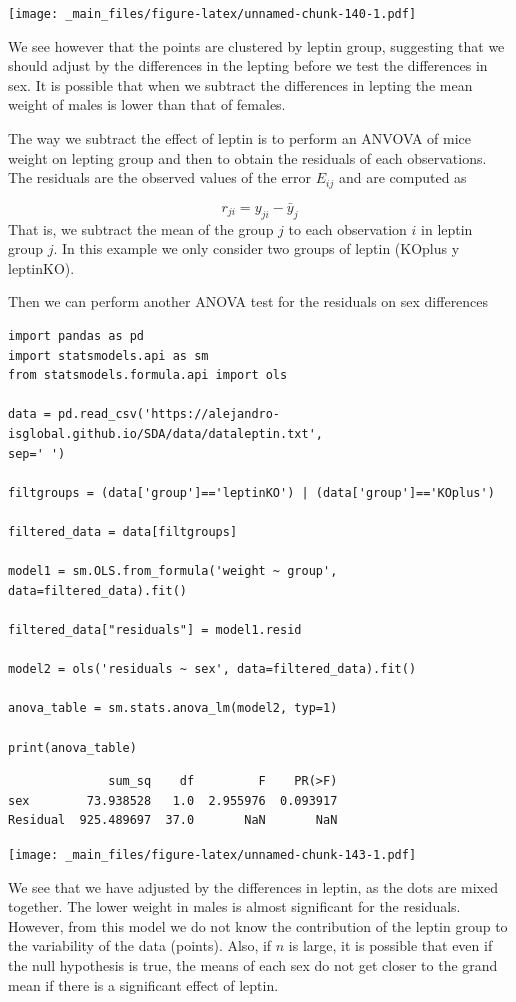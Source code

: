 \documentclass[
]{book}
\begin{document}
\texttt{[image: \_main\_files/figure-latex/unnamed-chunk-140-1.pdf]}

We see however that the points are clustered by leptin group, suggesting that we should adjust by the differences in the lepting before we test the differences in sex. It is possible that when we subtract the differences in lepting the mean weight of males is lower than that of females.

The way we subtract the effect of leptin is to perform an ANVOVA of mice weight on lepting group and then to obtain the residuals of each observations. The residuals are the observed values of the error \(E_{ij}\) and are computed as

\[r_{ji}=y_{ji}-\bar{y}_j\]
That is, we subtract the mean of the group \(j\) to each observation \(i\) in leptin group \(j\). In this example we only consider two groups of leptin (KOplus y leptinKO).

Then we can perform another ANOVA test for the residuals on sex differences

\begin{verbatim}
import pandas as pd
import statsmodels.api as sm
from statsmodels.formula.api import ols

data = pd.read_csv('https://alejandro-isglobal.github.io/SDA/data/dataleptin.txt', 
sep=' ')

filtgroups = (data['group']=='leptinKO') | (data['group']=='KOplus')

filtered_data = data[filtgroups]

model1 = sm.OLS.from_formula('weight ~ group', data=filtered_data).fit()

filtered_data["residuals"] = model1.resid

model2 = ols('residuals ~ sex', data=filtered_data).fit()

anova_table = sm.stats.anova_lm(model2, typ=1)

print(anova_table)
\end{verbatim}

\begin{verbatim}
              sum_sq    df         F    PR(>F)
sex        73.938528   1.0  2.955976  0.093917
Residual  925.489697  37.0       NaN       NaN
\end{verbatim}

\texttt{[image: \_main\_files/figure-latex/unnamed-chunk-143-1.pdf]}

We see that we have adjusted by the differences in leptin, as the dots are mixed together. The lower weight in males is almost significant for the residuals. However, from this model we do not know the contribution of the leptin group to the variability of the data (points). Also, if \(n\) is large, it is possible that even if the null hypothesis is true, the means of each sex do not get closer to the grand mean if there is a significant effect of leptin.
\end{document}

